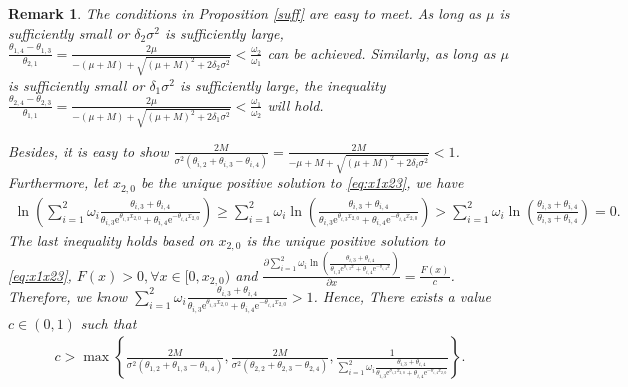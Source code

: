 \documentclass[11pt,reqno]{article}%
\newtheorem{remark}[theorem]{Remark}
\numberwithin{equation}{section}
\begin{document}
\begin{remark}
The conditions in Proposition \ref{suff} are easy to meet. As long as $\mu$ is sufficiently small or $\delta_2\sigma^2$ is sufficiently large, $\frac{\theta_{1,4}-\theta_{1,3}}{\theta_{2,1}}=\frac{2\mu}{-(\mu+M)+\sqrt{(\mu+M)^2+2\delta_2\sigma^2}}<\frac{\omega_2}{\omega_1}$ can be achieved. Similarly, as long as $\mu$ is sufficiently small or $\delta_1\sigma^2$ is sufficiently large, the inequality $\frac{\theta_{2,4}-\theta_{2,3}}{\theta_{1,1}}=\frac{2\mu}{-(\mu+M)+\sqrt{(\mu+M)^2+2\delta_1\sigma^2}}<\frac{\omega_1}{\omega_2}$ will hold.

Besides, it is easy to show $\frac{2M}{\sigma^2(\theta_{i,2}+\theta_{i,3}-\theta_{i,4})}=\frac{2M}{-\mu+M+\sqrt{(\mu+M)^2+2\delta_i\sigma^2}}<1$. Furthermore, let $x_{2,0}$ be the unique positive solution to \eqref{eq:x1x23}, we have
\begin{equation}\nonumber
\begin{aligned}
\ln\left( \sum\limits_{i=1}^{2}\omega_i\frac{\theta_{i,3}+\theta_{i,4}}{\theta_{i,3} \mathrm{e}^{\theta_{i,3}x_{2,0}}+\theta_{i,4}\mathrm{e}^{-\theta_{i,4}x_{2,0}}}\right)\ge\sum\limits_{i=1}^{2}\omega_i\ln\left(\frac{\theta_{i,3}+\theta_{i,4}}{\theta_{i,3} \mathrm{e}^{\theta_{i,3}x_{2,0}}+\theta_{i,4}\mathrm{e}^{-\theta_{i,4}x_{2,0}}}\right)>\sum\limits_{i=1}^{2}\omega_i\ln\left(\frac{\theta_{i,3}+\theta_{i,4}}{\theta_{i,3}+\theta_{i,4}}\right)=0.\end{aligned}
\end{equation}
The last inequality holds based on $x_{2,0}$ is the unique positive solution to \eqref{eq:x1x23}, $F(x)>0, \forall x \in[0,x_{2,0})$ and $\frac{\partial\sum\limits_{i=1}^{2}\omega_i\ln\left(\frac{\theta_{i,3}+\theta_{i,4}}{\theta_{i,3} \mathrm{e}^{\theta_{i,3}x}+\theta_{i,4}\mathrm{e}^{-\theta_{i,4}x}}\right)}{\partial x}=\frac{F(x)}{c}$. Therefore, we know $\sum\limits_{i=1}^{2}\omega_i\frac{\theta_{i,3}+\theta_{i,4}}{\theta_{i,3} \mathrm{e}^{\theta_{i,3}x_{2,0}}+\theta_{i,4}\mathrm{e}^{-\theta_{i,4}x_{2,0}}}>1$. Hence, There exists a value $c\in(0,1)$ such that 
\begin{equation}\nonumber
\begin{aligned}c> \max\left\{\frac{2M}{\sigma^2(\theta_{1,2}+\theta_{1,3}-\theta_{1,4})},\frac{2M}{\sigma^2(\theta_{2,2}+\theta_{2,3}-\theta_{2,4})},\frac{1}{\sum\limits_{i=1}^{2}\omega_i\frac{\theta_{i,3}+\theta_{i,4}}{\theta_{i,3} \mathrm{e}^{\theta_{i,3}x_{2,0}}+\theta_{i,4}\mathrm{e}^{-\theta_{i,4}x_{2,0}}}}\right\}.\end{aligned}
\end{equation}
\end{remark}
\end{document}
